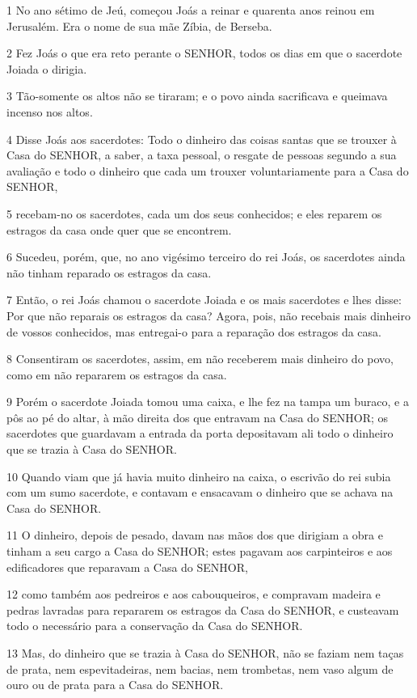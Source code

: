 \par 1 No ano sétimo de Jeú, começou Joás a reinar e quarenta anos reinou em Jerusalém. Era o nome de sua mãe Zíbia, de Berseba.
\par 2 Fez Joás o que era reto perante o SENHOR, todos os dias em que o sacerdote Joiada o dirigia.
\par 3 Tão-somente os altos não se tiraram; e o povo ainda sacrificava e queimava incenso nos altos.
\par 4 Disse Joás aos sacerdotes: Todo o dinheiro das coisas santas que se trouxer à Casa do SENHOR, a saber, a taxa pessoal, o resgate de pessoas segundo a sua avaliação e todo o dinheiro que cada um trouxer voluntariamente para a Casa do SENHOR,
\par 5 recebam-no os sacerdotes, cada um dos seus conhecidos; e eles reparem os estragos da casa onde quer que se encontrem.
\par 6 Sucedeu, porém, que, no ano vigésimo terceiro do rei Joás, os sacerdotes ainda não tinham reparado os estragos da casa.
\par 7 Então, o rei Joás chamou o sacerdote Joiada e os mais sacerdotes e lhes disse: Por que não reparais os estragos da casa? Agora, pois, não recebais mais dinheiro de vossos conhecidos, mas entregai-o para a reparação dos estragos da casa.
\par 8 Consentiram os sacerdotes, assim, em não receberem mais dinheiro do povo, como em não repararem os estragos da casa.
\par 9 Porém o sacerdote Joiada tomou uma caixa, e lhe fez na tampa um buraco, e a pôs ao pé do altar, à mão direita dos que entravam na Casa do SENHOR; os sacerdotes que guardavam a entrada da porta depositavam ali todo o dinheiro que se trazia à Casa do SENHOR.
\par 10 Quando viam que já havia muito dinheiro na caixa, o escrivão do rei subia com um sumo sacerdote, e contavam e ensacavam o dinheiro que se achava na Casa do SENHOR.
\par 11 O dinheiro, depois de pesado, davam nas mãos dos que dirigiam a obra e tinham a seu cargo a Casa do SENHOR; estes pagavam aos carpinteiros e aos edificadores que reparavam a Casa do SENHOR,
\par 12 como também aos pedreiros e aos cabouqueiros, e compravam madeira e pedras lavradas para repararem os estragos da Casa do SENHOR, e custeavam todo o necessário para a conservação da Casa do SENHOR.
\par 13 Mas, do dinheiro que se trazia à Casa do SENHOR, não se faziam nem taças de prata, nem espevitadeiras, nem bacias, nem trombetas, nem vaso algum de ouro ou de prata para a Casa do SENHOR.
